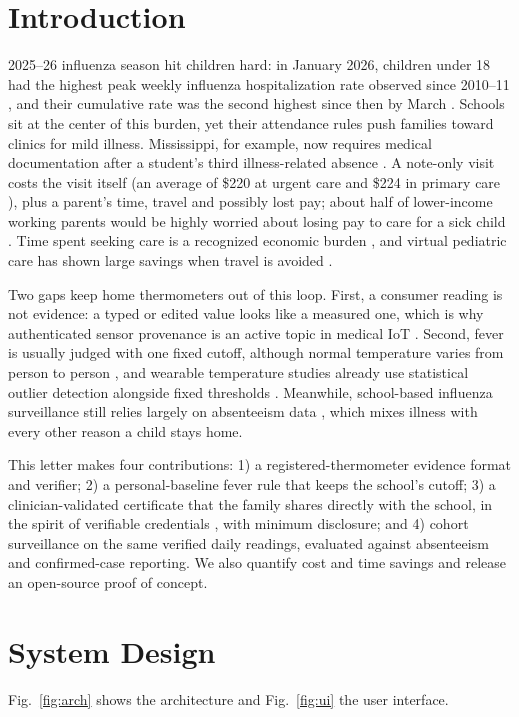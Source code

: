 \documentclass[journal]{IEEEtran}
\begin{document}
\section{Introduction}
 2025--26 influenza season hit children hard: in January 2026, children under 18 had the highest peak weekly influenza hospitalization rate observed since 2010--11 \cite{cdcw2}, and their cumulative rate was the second highest since then by March \cite{cdcw10}. Schools sit at the center of this burden, yet their attendance rules push families toward clinics for mild illness. Mississippi, for example, now requires medical documentation after a student's third illness-related absence \cite{ms2026}. A note-only visit costs the visit itself (an average of \$220 at urgent care and \$224 in primary care \cite{hcci2026}), plus a parent's time, travel and possibly lost pay; about half of lower-income working parents would be highly worried about losing pay to care for a sick child \cite{pew2026}. Time spent seeking care is a recognized economic burden \cite{sollis2026}, and virtual pediatric care has shown large savings when travel is avoided \cite{lim2026}.

Two gaps keep home thermometers out of this loop. First, a consumer reading is not evidence: a typed or edited value looks like a measured one, which is why authenticated sensor provenance is an active topic in medical IoT \cite{shukla2026}. Second, fever is usually judged with one fixed cutoff, although normal temperature varies from person to person \cite{merck2026}, and wearable temperature studies already use statistical outlier detection alongside fixed thresholds \cite{liu2026}. Meanwhile, school-based influenza surveillance still relies largely on absenteeism data \cite{joshy2026}, which mixes illness with every other reason a child stays home.

This letter makes four contributions: 1) a registered-thermometer evidence format and verifier; 2) a personal-baseline fever rule that keeps the school's cutoff; 3) a clinician-validated certificate that the family shares directly with the school, in the spirit of verifiable credentials \cite{w3c2026}, with minimum disclosure; and 4) cohort surveillance on the same verified daily readings, evaluated against absenteeism and confirmed-case reporting. We also quantify cost and time savings and release an open-source proof of concept.

\section{System Design}
Fig.~\ref{fig:arch} shows the architecture and Fig.~\ref{fig:ui} the user interface.
\end{document}
